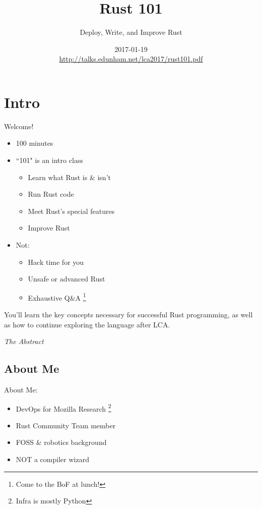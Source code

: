 \documentclass[aspectratio=169]{beamer}
\title[Rust 101]{Rust 101}
\subtitle{Deploy, Write, and Improve Rust}
\author{\name}
\date{2017-01-19\\ \url{http://talks.edunham.net/lca2017/rust101.pdf}}
\begin{document}
\begin{frame}
\titlepage
\end{frame}

\section{Intro}

\begin{frame}
    Welcome!
     \begin{itemize}
        \item 100 minutes
        \item ``101" is an intro class
        \begin{itemize}
            \item Learn what Rust is \& isn't
            \item Run Rust code
            \item Meet Rust's special features
            \item Improve Rust
        \end{itemize}
        \item Not:
        \begin{itemize}
            \item Hack time for you
            \item Unsafe or advanced Rust
            \item Exhaustive Q\&A \footnote{Come to the BoF at lunch!}
        \end{itemize}
    \end{itemize}
\end{frame}

\begin{frame}

\epigraph{You'll learn the key concepts necessary for successful Rust
programming, as well as how to continue exploring the language after
LCA.}{\textit{The Abstract}}

\end{frame}

\subsection{About Me}

\begin{frame}
    About Me:
    \begin{itemize}
        \item DevOps for Mozilla Research \footnote{Infra is mostly Python}
        \item Rust Community Team member
        \item FOSS \& robotics background
        \item NOT a compiler wizard
    \end{itemize}
\end{frame}
\end{document}
